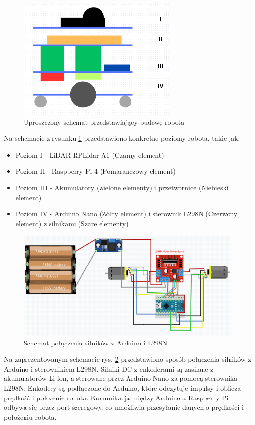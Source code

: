 \documentclass[a4paper,twoside,12pt]{book}
\begin{document}
	\begin{figure}[!hb]
		\centering
		\includegraphics[width=0.7\textwidth]{images/schemat-robot.png}
		\caption{Uproszczony schemat przedstawiający budowę robota}
		\label{fig:robot-schemat}
		\end{figure}
Na schemacie z rysunku \ref{fig:robot-schemat} przedstawiono konkretne poziomy robota, takie jak:
\begin{itemize}
	\item Poziom I - LiDAR RPLidar A1 (Czarny element)
	\item Poziom II - Raspberry Pi 4 (Pomarańczowy element)
	\item Poziom III - Akumulatory (Zielone elementy) i przetwornice (Niebieski element)
	\item Poziom IV - Arduino Nano (Żółty element) i sterownik L298N (Czerwony element) z silnikami (Szare elementy)
\end{itemize}
\newpage

\begin{figure}[!hb]
	\centering
	\includegraphics[width=1\textwidth]{images/schema_arduino.png}
	\caption{Schemat połączenia silników z Arduino i L298N}
	\label{fig:arduino-schema}
	\end{figure}
Na zaprezentowanym schemacie rys. \ref{fig:arduino-schema} przedstawiono sposób połączenia silników z Arduino i sterownikiem L298N. Silniki DC z enkoderami są zasilane z akumulatorów Li-ion, a sterowane przez Arduino Nano za pomocą sterownika L298N. Enkodery są podłączone do Arduino, które odczytuje impulsy i oblicza prędkość i położenie robota. Komunikacja między Arduino a Raspberry Pi odbywa się przez port szeregowy, co umożliwia przesyłanie danych o prędkości i położeniu robota.
\end{document}
